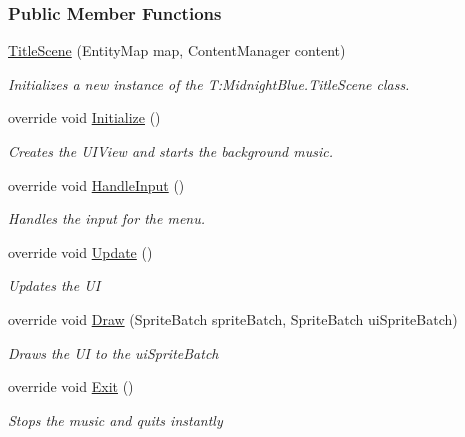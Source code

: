 \subsubsection*{Public Member Functions}
\begin{DoxyCompactItemize}
\item 
\hyperlink{class_midnight_blue_1_1_title_scene_a409eb89a58dbec10d5a0002ce78bc9a3}{Title\+Scene} (Entity\+Map map, Content\+Manager content)
\begin{DoxyCompactList}\small\item\em Initializes a new instance of the T\+:\+Midnight\+Blue.\+Title\+Scene class. \end{DoxyCompactList}\item 
override void \hyperlink{class_midnight_blue_1_1_title_scene_a793aa8253fba8d62a4ee19f042b22891}{Initialize} ()
\begin{DoxyCompactList}\small\item\em Creates the U\+I\+View and starts the background music. \end{DoxyCompactList}\item 
override void \hyperlink{class_midnight_blue_1_1_title_scene_a54dc02f150eb90dac2fcc6e37a077723}{Handle\+Input} ()
\begin{DoxyCompactList}\small\item\em Handles the input for the menu. \end{DoxyCompactList}\item 
override void \hyperlink{class_midnight_blue_1_1_title_scene_a4052b2a261434462cd0150e2f4da3c5b}{Update} ()
\begin{DoxyCompactList}\small\item\em Updates the UI \end{DoxyCompactList}\item 
override void \hyperlink{class_midnight_blue_1_1_title_scene_a03fa806a36226ec5fd0ce09870109c18}{Draw} (Sprite\+Batch sprite\+Batch, Sprite\+Batch ui\+Sprite\+Batch)
\begin{DoxyCompactList}\small\item\em Draws the UI to the ui\+Sprite\+Batch \end{DoxyCompactList}\item 
override void \hyperlink{class_midnight_blue_1_1_title_scene_aed29e37e9f849cc8f8443bae057a8eb8}{Exit} ()
\begin{DoxyCompactList}\small\item\em Stops the music and quits instantly \end{DoxyCompactList}\item 

\end{DoxyCompactItemize}
